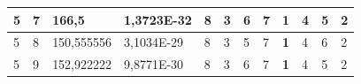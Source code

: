 \documentclass[conference]{IEEEtran}
\begin{document}
\begin{table}[]
\begin{tabular}{|llll|llllllll|}
\multicolumn{1}{|l|}{5}                                                     & \multicolumn{1}{l|}{7}                                                        & \multicolumn{1}{l|}{166,5}                                                        & 1,3723E-32                     & \multicolumn{1}{l|}{8}                                                  & \multicolumn{1}{l|}{3}                                                  & \multicolumn{1}{l|}{6}                                                  & \multicolumn{1}{l|}{7}                                                  & \multicolumn{1}{l|}{\textbf{1}}                                         & \multicolumn{1}{l|}{4}                                                  & \multicolumn{1}{l|}{5}                                                  & 2                          \\ \hline
\multicolumn{1}{|l|}{5}                                                     & \multicolumn{1}{l|}{8}                                                        & \multicolumn{1}{l|}{150,555556}                                                   & 3,1034E-29                     & \multicolumn{1}{l|}{8}                                                  & \multicolumn{1}{l|}{3}                                                  & \multicolumn{1}{l|}{5}                                                  & \multicolumn{1}{l|}{7}                                                  & \multicolumn{1}{l|}{\textbf{1}}                                         & \multicolumn{1}{l|}{4}                                                  & \multicolumn{1}{l|}{6}                                                  & 2                          \\ \hline
\multicolumn{1}{|l|}{5}                                                     & \multicolumn{1}{l|}{9}                                                        & \multicolumn{1}{l|}{152,922222}                                                   & 9,8771E-30                     & \multicolumn{1}{l|}{8}                                                  & \multicolumn{1}{l|}{3}                                                  & \multicolumn{1}{l|}{6}                                                  & \multicolumn{1}{l|}{7}                                                  & \multicolumn{1}{l|}{\textbf{1}}                                         & \multicolumn{1}{l|}{4}                                                  & \multicolumn{1}{l|}{5}                                                  & 2                          \\ \hline

\end{tabular}
\end{table}
\end{document}
